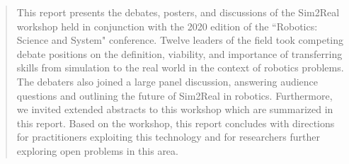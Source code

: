 \begin{abstract}



This report presents the debates, posters, and discussions of the Sim2Real workshop held in conjunction with the 2020 edition of the ``Robotics: Science and System" conference. Twelve leaders of the field took competing debate positions on the definition, viability, and importance of transferring skills from simulation to the real world in the context of robotics problems. The debaters also joined a large panel discussion, answering audience questions and outlining the future of Sim2Real in robotics. Furthermore, we invited extended abstracts to this workshop which are summarized in this report. Based on the workshop, this report concludes with directions for practitioners exploiting this technology and for researchers further exploring open problems in this area.

\end{abstract}